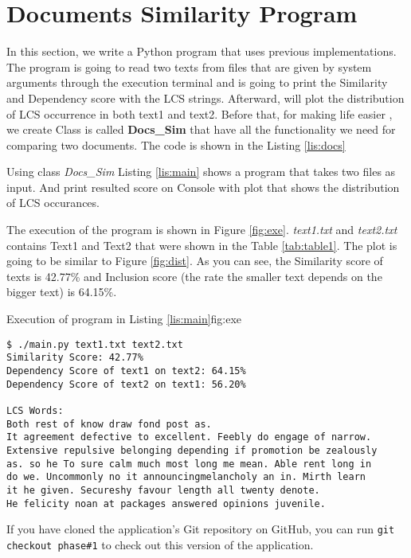 \section{Documents Similarity Program}

In this section, we write a Python program that uses previous 
implementations. The program is going to read two texts from 
files that are given by system arguments through the execution 
terminal and is going to print the Similarity and Dependency score 
with the LCS strings. Afterward, will plot the distribution of LCS 
occurrence in both text1 and text2. Before that, for making life easier
, we create Class is called \textbf{Docs_Sim} that have all the functionality
we need for comparing two documents. The code is shown in the Listing \ref{lis:docs}


Using class \textit{Docs_Sim} Listing \ref{lis:main} shows a program that takes two files as input.
And print resulted score on Console with plot that shows the distribution of LCS occurances.


The execution of the program is shown in Figure \ref{fig:exe}. \textit{text1.txt}
and \textit{text2.txt} contains Text1 and Text2 that were shown in the
Table \ref{tab:table1}. The plot is going to be similar to Figure \ref{fig:dist}. As
you can see, the Similarity score of texts is 42.77\% and Inclusion score
(the rate the smaller text depends on the bigger text) is 64.15\%.

\begin{fig-terminal}{Execution of program in Listing \ref{lis:main}}{fig:exe}
\begin{lstlisting}[style=BASH]
$ ./main.py text1.txt text2.txt
Similarity Score: 42.77%  
Dependency Score of text1 on text2: 64.15%  
Dependency Score of text2 on text1: 56.20%

LCS Words:  
Both rest of know draw fond post as. 
It agreement defective to excellent. Feebly do engage of narrow. 
Extensive repulsive belonging depending if promotion be zealously 
as. so he To sure calm much most long me mean. Able rent long in 
do we. Uncommonly no it announcingmelancholy an in. Mirth learn 
it he given. Secureshy favour length all twenty denote. 
He felicity noan at packages answered opinions juvenile.
\end{lstlisting}
\end{fig-terminal}
If you have cloned the application’s Git repository on GitHub, you
can run \texttt{git checkout phase\#1} to check out this version of the application.

